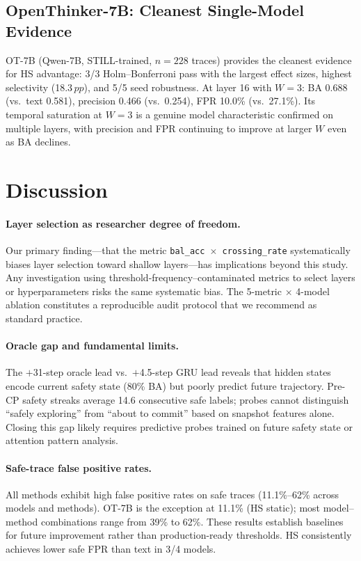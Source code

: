 \documentclass[11pt,a4paper]{article}
\newcommand{\pp}{\,pp}
\begin{document}
\subsection{OpenThinker-7B: Cleanest Single-Model Evidence}
\label{sec:ot7b}

OT-7B (Qwen-7B, STILL-trained, $n=228$ traces) provides the cleanest evidence for HS advantage: 3/3 Holm--Bonferroni pass with the largest effect sizes, highest selectivity (18.3$\pp$), and 5/5 seed robustness.
At layer 16 with $W=3$: BA 0.688 (vs.\ text 0.581), precision 0.466 (vs.\ 0.254), FPR 10.0\% (vs.\ 27.1\%).
Its temporal saturation at $W=3$ is a genuine model characteristic confirmed on multiple layers, with precision and FPR continuing to improve at larger $W$ even as BA declines.

\section{Discussion}
\label{sec:discussion}

\paragraph{Layer selection as researcher degree of freedom.}
Our primary finding---that the metric \texttt{bal\_acc $\times$ crossing\_rate} systematically biases layer selection toward shallow layers---has implications beyond this study.
Any investigation using threshold-frequency--contaminated metrics to select layers or hyperparameters risks the same systematic bias.
The 5-metric $\times$ 4-model ablation constitutes a reproducible audit protocol that we recommend as standard practice.

\paragraph{Oracle gap and fundamental limits.}
The $+$31-step oracle lead vs.\ $+$4.5-step GRU lead reveals that hidden states encode current safety state (80\% BA) but poorly predict future trajectory.
Pre-CP safety streaks average 14.6 consecutive safe labels; probes cannot distinguish ``safely exploring'' from ``about to commit'' based on snapshot features alone.
Closing this gap likely requires predictive probes trained on future safety state or attention pattern analysis.

\paragraph{Safe-trace false positive rates.}
All methods exhibit high false positive rates on safe traces (11.1\%--62\% across models and methods).
OT-7B is the exception at 11.1\% (HS static); most model--method combinations range from 39\% to 62\%.
These results establish baselines for future improvement rather than production-ready thresholds.
HS consistently achieves lower safe FPR than text in 3/4 models.
\end{document}
